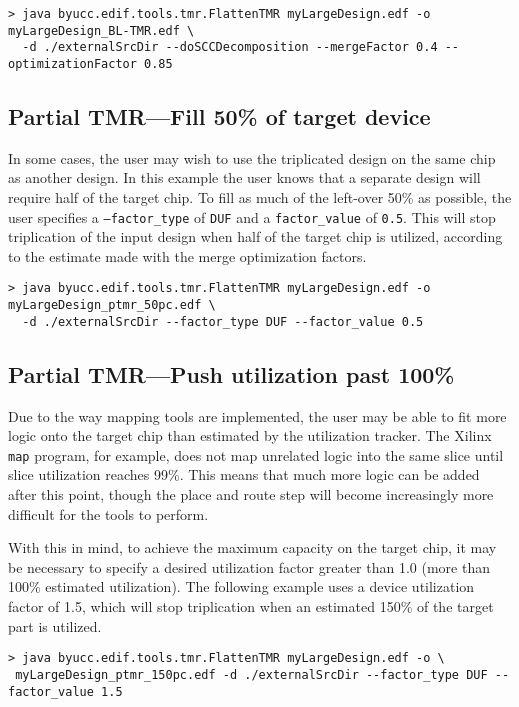 \documentclass[english]{article}
\begin{document}
\begin{verbatim}
> java byucc.edif.tools.tmr.FlattenTMR myLargeDesign.edf -o myLargeDesign_BL-TMR.edf \
  -d ./externalSrcDir --doSCCDecomposition --mergeFactor 0.4 --optimizationFactor 0.85
\end{verbatim}


\subsection{Partial TMR---Fill 50\% of target device}
In some cases, the user may wish to use the triplicated design on the same chip 
as another design. In this example the user knows that a separate design will 
require half of the target chip. To fill as much of the left-over 50\% as 
possible, the user specifies a \texttt{--factor\_type} of \texttt{DUF} and a 
\texttt{factor\_value} of \texttt{0.5}. This will stop triplication of the 
input design when half of the target chip is utilized, according to the 
estimate made with the merge optimization factors.

\begin{verbatim}
> java byucc.edif.tools.tmr.FlattenTMR myLargeDesign.edf -o myLargeDesign_ptmr_50pc.edf \
  -d ./externalSrcDir --factor_type DUF --factor_value 0.5
\end{verbatim}


\subsection{Partial TMR---Push utilization past 100\%}
Due to the way mapping tools are implemented, the user may be able to fit more 
logic onto the target chip than estimated by the utilization tracker. The 
Xilinx \texttt{map} program, for example, does not map unrelated logic into the 
same slice until slice utilization reaches 99\%. This means that much more 
logic can be added after this point, though the place and route step will 
become increasingly more difficult for the tools to perform.

With this in mind, to achieve the maximum capacity on the target chip, it may 
be necessary to specify a desired utilization factor greater than 1.0 (more 
than 100\% estimated utilization). The following example uses a device 
utilization factor of 1.5, which will stop triplication when an estimated 150\% 
of the target part is utilized.

\begin{verbatim}
> java byucc.edif.tools.tmr.FlattenTMR myLargeDesign.edf -o \
 myLargeDesign_ptmr_150pc.edf -d ./externalSrcDir --factor_type DUF --factor_value 1.5
\end{verbatim}
\end{document}
